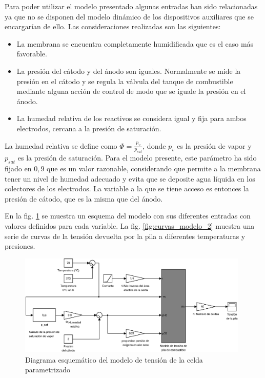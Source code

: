 Para poder utilizar el modelo presentado algunas entradas han sido relacionadas ya que no se disponen del modelo dinámico
de los dispositivos auxiliares que se encargarían de ello. Las consideraciones realizadas son las siguientes:

\begin{itemize}
 \item La membrana se encuentra completamente humidificada que es el caso más favorable.
 \item La presión del cátodo y del ánodo son iguales. Normalmente se mide la presión en el cátodo
 y se regula la válvula del tanque de combustible mediante alguna acción de control de modo que 
 se iguale la presión en el ánodo.
 \item La humedad relativa de los reactivos se considera igual y fija para ambos electrodos, cercana a la presión de saturación.
\end{itemize}

La humedad relativa se define como $\Phi = \frac{p_{v}}{p_{sat}}$, donde $p_{v}$ es la presión de vapor y $p_{sat}$ es la presión de saturación.
Para el modelo presente, este parámetro ha sido fijado en $0,9$ que es un valor razonable, considerando que permite a la membrana tener un nivel
de humedad adecuado y evita que se deposite agua líquida en los colectores de los electrodos. La variable a la que se tiene acceso es entonces
la presión de cátodo, que es la misma que del ánodo.

En la fig. \ref{fig:modelo_2} se muestra un esquema del modelo con sus diferentes entradas con valores definidos para cada variable. 
La fig. \ref{fig:curvas_modelo_2} muestra una serie de curvas de la tensión devuelta por la pila a diferentes temperaturas y presiones.

\begin{figure}[H]
 \centering
 \includegraphics[width=11cm]{gfx/modelo_2.eps}
 \caption{Diagrama esquemático del modelo de tensión de la celda parametrizado}
 \label{fig:modelo_2}
\end{figure}

